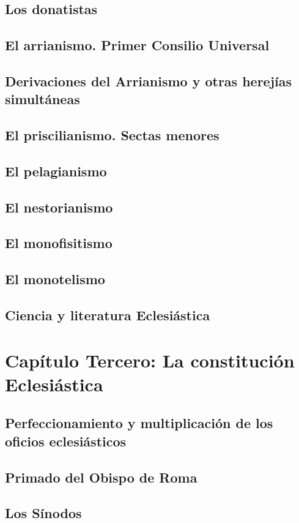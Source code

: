 \raggedbottom{} \documentclass[12pt, a4paper]{book}
\begin{document}
\section{Los donatistas}
\section{El arrianismo. Primer Consilio Universal}
\section{Derivaciones del Arrianismo y otras herejías simultáneas}
\section{El priscilianismo. Sectas menores}
\section{El pelagianismo}
\section{El nestorianismo}
\section{El monofisitismo}
\section{El monotelismo}
\section{Ciencia y literatura Eclesiástica}
\chapter{Capítulo Tercero: La constitución Eclesiástica}
\section{Perfeccionamiento y multiplicación de los oficios eclesiásticos}
\section{Primado del Obispo de Roma}
\section{Los Sínodos}
\end{document}
